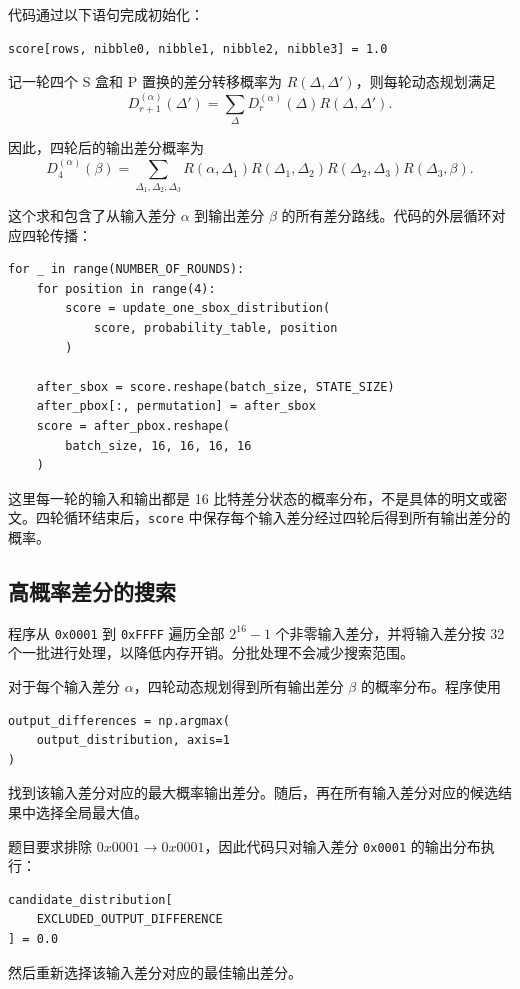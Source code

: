 代码通过以下语句完成初始化：
\begin{lstlisting}
score[rows, nibble0, nibble1, nibble2, nibble3] = 1.0
\end{lstlisting}

记一轮四个 S 盒和 P 置换的差分转移概率为 $R(\Delta,\Delta')$，则每轮动态规划满足
\[
    D_{r+1}^{(\alpha)}(\Delta')
    =
    \sum_{\Delta}
    D_r^{(\alpha)}(\Delta)R(\Delta,\Delta').
\]

因此，四轮后的输出差分概率为
\[
    D_4^{(\alpha)}(\beta)
    =
    \sum_{\Delta_1,\Delta_2,\Delta_3}
    R(\alpha,\Delta_1)
    R(\Delta_1,\Delta_2)
    R(\Delta_2,\Delta_3)
    R(\Delta_3,\beta).
\]

这个求和包含了从输入差分 $\alpha$ 到输出差分 $\beta$ 的所有差分路线。代码的外层循环对应四轮传播：
\begin{lstlisting}
for _ in range(NUMBER_OF_ROUNDS):
    for position in range(4):
        score = update_one_sbox_distribution(
            score, probability_table, position
        )

    after_sbox = score.reshape(batch_size, STATE_SIZE)
    after_pbox[:, permutation] = after_sbox
    score = after_pbox.reshape(
        batch_size, 16, 16, 16, 16
    )
\end{lstlisting}

这里每一轮的输入和输出都是 16 比特差分状态的概率分布，不是具体的明文或密文。四轮循环结束后，\texttt{score} 中保存每个输入差分经过四轮后得到所有输出差分的概率。

\subsection{高概率差分的搜索}

程序从 \texttt{0x0001} 到 \texttt{0xFFFF} 遍历全部 $2^{16}-1$ 个非零输入差分，并将输入差分按 32 个一批进行处理，以降低内存开销。分批处理不会减少搜索范围。

对于每个输入差分 $\alpha$，四轮动态规划得到所有输出差分 $\beta$ 的概率分布。程序使用
\begin{lstlisting}
output_differences = np.argmax(
    output_distribution, axis=1
)
\end{lstlisting}
找到该输入差分对应的最大概率输出差分。随后，再在所有输入差分对应的候选结果中选择全局最大值。

题目要求排除 $0x0001\rightarrow0x0001$，因此代码只对输入差分 \texttt{0x0001} 的输出分布执行：
\begin{lstlisting}
candidate_distribution[
    EXCLUDED_OUTPUT_DIFFERENCE
] = 0.0
\end{lstlisting}
然后重新选择该输入差分对应的最佳输出差分。

